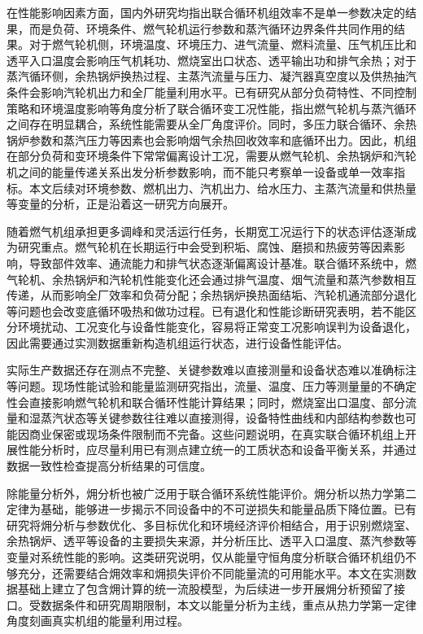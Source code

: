 在性能影响因素方面，国内外研究均指出联合循环机组效率不是单一参数决定的结果，而是负荷、环境条件、燃气轮机运行参数和蒸汽循环边界条件共同作用的结果。对于燃气轮机侧，环境温度、环境压力、进气流量、燃料流量、压气机压比和透平入口温度会影响压气机耗功、燃烧室出口状态、透平输出功和排气余热；对于蒸汽循环侧，余热锅炉换热过程、主蒸汽流量与压力、凝汽器真空度以及供热抽汽条件会影响汽轮机出力和全厂能量利用水平。已有研究从部分负荷特性、不同控制策略和环境温度影响等角度分析了联合循环变工况性能，指出燃气轮机与蒸汽循环之间存在明显耦合，系统性能需要从全厂角度评价\cite{kim2004partload,hyun2018dual,yang2019inlet,zhang2018chp,li2018backpressure}。同时，多压力联合循环、余热锅炉参数和蒸汽压力等因素也会影响烟气余热回收效率和底循环出力\cite{ibrahim2014multipressure,yang2018hrsg,liying2006steam}。因此，机组在部分负荷和变环境条件下常常偏离设计工况，需要从燃气轮机、余热锅炉和汽轮机之间的能量传递关系出发分析参数影响，而不能只考察单一设备或单一效率指标。本文后续对环境参数、燃机出力、汽机出力、给水压力、主蒸汽流量和供热量等变量的分析，正是沿着这一研究方向展开。

随着燃气机组承担更多调峰和灵活运行任务，长期宽工况运行下的状态评估逐渐成为研究重点。燃气轮机在长期运行中会受到积垢、腐蚀、磨损和热疲劳等因素影响，导致部件效率、通流能力和排气状态逐渐偏离设计基准\cite{diakunchak1992deterioration,kurz2001degradation}。联合循环系统中，燃气轮机、余热锅炉和汽轮机性能变化还会通过排气温度、烟气流量和蒸汽参数相互传递，从而影响全厂效率和负荷分配；余热锅炉换热面结垢、汽轮机通流部分退化等问题也会改变底循环吸热和做功过程\cite{marner1984fouling,zwebek2003degradation,massardo2009hrsg}。已有退化和性能诊断研究表明，若不能区分环境扰动、工况变化与设备性能变化，容易将正常变工况影响误判为设备退化\cite{li2009prognostic,tahan2017health}，因此需要通过实测数据重新构造机组运行状态，进行设备性能评估。

实际生产数据还存在测点不完整、关键参数难以直接测量和设备状态难以准确标注等问题。现场性能试验和能量监测研究指出，流量、温度、压力等测量量的不确定性会直接影响燃气轮机和联合循环性能计算结果\cite{pinelli2000uncertainties,carstens2018uncertainty}；同时，燃烧室出口温度、部分流量和湿蒸汽状态等关键参数往往难以直接测得，设备特性曲线和内部结构参数也可能因商业保密或现场条件限制而不完备\cite{colera2019thermodynamic,vonmoll2014egt,vemulapalli2022softsensor,tian2018softmeasurement}。这些问题说明，在真实联合循环机组上开展性能分析时，应尽量利用已有测点建立统一的工质状态和设备平衡关系，并通过数据一致性检查提高分析结果的可信度。

除能量分析外，㶲分析也被广泛用于联合循环系统性能评价。㶲分析以热力学第二定律为基础，能够进一步揭示不同设备中的不可逆损失和能量品质下降位置。已有研究将㶲分析与参数优化、多目标优化和环境经济评价相结合，用于识别燃烧室、余热锅炉、透平等设备的主要损失来源，并分析压比、透平入口温度、蒸汽参数等变量对系统性能的影响\cite{kaviri2012exergy,ahmadi2011exergo}。这类研究说明，仅从能量守恒角度分析联合循环机组仍不够充分，还需要结合㶲效率和㶲损失评价不同能量流的可用能水平。本文在实测数据基础上建立了包含㶲计算的统一流股模型，为后续进一步开展㶲分析预留了接口。受数据条件和研究周期限制，本文以能量分析为主线，重点从热力学第一定律角度刻画真实机组的能量利用过程。

